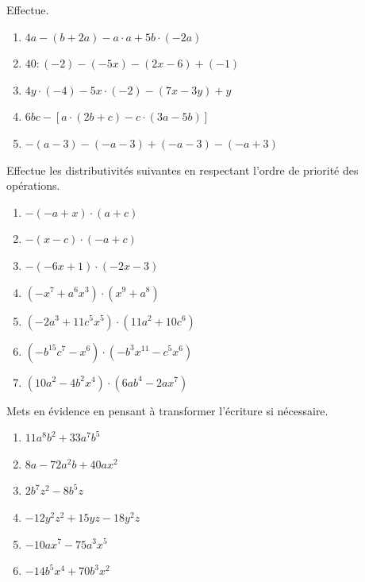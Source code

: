 \documentclass[12pt,parskip=half-, twoside=semi]{scrartcl}
\begin{document}
\setcounter{exercise}{0}

\begin{exercise}Effectue.
  \begin{enumerate}[cols=2]
    \item $4 a-(b+2 a)-a \cdot a+5 b \cdot(-2 a)$
    \item $40:(-2)-(-5 x)-(2 x-6)+(-1)$
    \item $4 y \cdot(-4)-5 x \cdot(-2)-(7 x-3 y)+y$
    \item $6 b c-[a \cdot(2 b+c)-c \cdot(3 a-5 b)]$
    \item $-(a-3)-(-a-3)+(-a-3)-(-a+3)$
  \end{enumerate}
\end{exercise}

\begin{exercise}Effectue les distributivités suivantes en respectant l'ordre de priorité des opérations.
  \begin{enumerate}[cols=2]
     \item $-(-a+x) \cdot(a+c)$
     \item $-(x-c) \cdot(-a+c)$
     \item $-(-6 x+1) \cdot(-2 x-3)$
     \item $\left(-x^7+a^6 x^3\right) \cdot\left(x^9+a^8\right)$
     \item $\left(-2 a^3+11 c^5 x^5\right) \cdot\left(11 a^2+10 c^6\right)$
     \item $\left(-b^{15} c^7-x^6\right) \cdot\left(-b^3 x^{11}-c^5 x^6\right)$
     \item $\left(10 a^2-4 b^2 x^4\right) \cdot\left(6 a b^4-2 a x^7\right)$
  \end{enumerate}
\end{exercise}

\begin{exercise}Mets en évidence en pensant à transformer l'écriture si nécessaire.
  \begin{enumerate}[cols=2]
      \item $11 a^8 b^2+33 a^7 b^5$
      \item $8 a-72 a^2 b+40 a x^2$
      \item $2 b^7 z^2-8 b^5 z$
      \item $-12 y^2 z^2+15 y z-18 y^2 z$
      \item $-10 a x^7-75 a^3 x^5$
      \item $-14 b^5 x^4+70 b^3 x^2$
  \end{enumerate}
\end{exercise}
\end{document}
